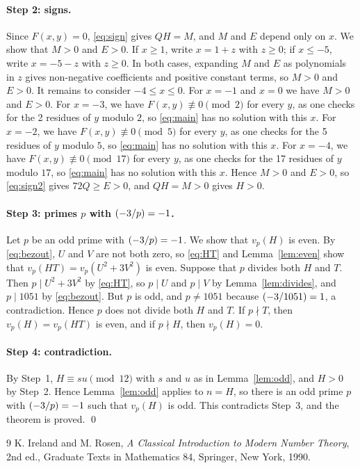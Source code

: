 \documentclass[11pt]{article}
\newcommand{\leg}[2]{\mathchoice{\biggl(\dfrac{#1}{#2}\biggr)}{(#1/#2)}{(#1/#2)}{(#1/#2)}}
\begin{document}
\paragraph{Step 2: signs.} Since $F(x,y)=0$, \eqref{eq:sign} gives $QH=M$, and $M$ and $E$ depend only on $x$. We show that $M>0$ and $E>0$. If $x\geq1$, write $x=1+z$ with $z\geq0$; if $x\leq-5$, write $x=-5-z$ with $z\geq0$. In both cases, expanding $M$ and $E$ as polynomials in $z$ gives non-negative coefficients and positive constant terms, so $M>0$ and $E>0$. It remains to consider $-4\leq x\leq0$. For $x=-1$ and $x=0$ we have $M>0$ and $E>0$. For $x=-3$, we have $F(x,y)\not\equiv0\pmod{2}$ for every $y$, as one checks for the 2 residues of $y$ modulo $2$, so \eqref{eq:main} has no solution with this $x$. For $x=-2$, we have $F(x,y)\not\equiv0\pmod{5}$ for every $y$, as one checks for the 5 residues of $y$ modulo $5$, so \eqref{eq:main} has no solution with this $x$. For $x=-4$, we have $F(x,y)\not\equiv0\pmod{17}$ for every $y$, as one checks for the 17 residues of $y$ modulo $17$, so \eqref{eq:main} has no solution with this $x$. Hence $M>0$ and $E>0$, so \eqref{eq:sign2} gives $72Q\geq E>0$, and $QH=M>0$ gives $H>0$.

\paragraph{\texorpdfstring{Step 3: primes $p$ with $\leg{-3}{p}=-1$.}{Step 3: inert primes.}} Let $p$ be an odd prime with $\leg{-3}{p}=-1$. We show that $v_p(H)$ is even. By \eqref{eq:bezout}, $U$ and $V$ are not both zero, so \eqref{eq:HT} and Lemma~\ref{lem:even} show that $v_p(HT)=v_p(U^2+3V^2)$ is even. Suppose that $p$ divides both $H$ and $T$. Then $p\mid U^2+3V^2$ by \eqref{eq:HT}, so $p\mid U$ and $p\mid V$ by Lemma~\ref{lem:divides}, and $p\mid 1051$ by \eqref{eq:bezout}. But $p$ is odd, and $p\neq1051$ because $\leg{-3}{1051}=1$, a contradiction. Hence $p$ does not divide both $H$ and $T$. If $p\nmid T$, then $v_p(H)=v_p(HT)$ is even, and if $p\nmid H$, then $v_p(H)=0$.

\paragraph{Step 4: contradiction.} By Step~1, $H\equiv su\pmod{12}$ with $s$ and $u$ as in Lemma~\ref{lem:odd}, and $H>0$ by Step~2. Hence Lemma~\ref{lem:odd} applies to $n=H$, so there is an odd prime $p$ with $\leg{-3}{p}=-1$ such that $v_p(H)$ is odd. This contradicts Step~3, and the theorem is proved.
\qed

\begin{thebibliography}{9}
 K. Ireland and M. Rosen, \emph{A Classical Introduction to Modern Number Theory}, 2nd ed., Graduate Texts in Mathematics 84, Springer, New York, 1990.
\end{thebibliography}
\end{document}
